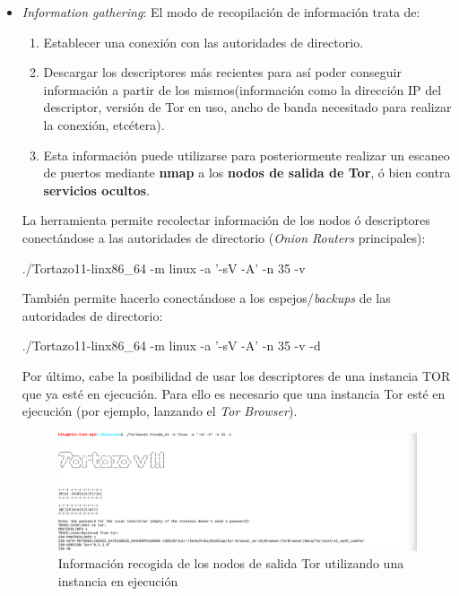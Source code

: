 \begin{itemize}
	\item{\textit{Information gathering}}: El modo de recopilación de información trata de:
	\begin{enumerate}
		\item Establecer una conexión con las autoridades de directorio.
		\item Descargar los descriptores más recientes para así poder conseguir información a partir de los mismos(información como  la dirección IP del descriptor, versión de Tor en uso, ancho de banda necesitado para realizar la conexión, etcétera). 
		\item Esta información puede utilizarse para posteriormente realizar un escaneo de puertos mediante \textbf{nmap} a los \textbf{nodos de salida de Tor}, ó bien contra \textbf{servicios ocultos}. 
	\end{enumerate}
	
	La herramienta permite recolectar información de los nodos ó descriptores conectándose a las autoridades de directorio (\textit{Onion Routers} principales):
	
	{\selectfont 
		./Tortazo11-linx86\_64 -m linux -a '-sV -A' -n 35 -v
	}
	
	También permite hacerlo conectándose a los espejos/\textit{backups} de las autoridades de directorio:
	
	{\selectfont 
		./Tortazo11-linx86\_64 -m linux -a '-sV -A' -n 35 -v -d
	}
	
	Por último, cabe la posibilidad de usar los descriptores de una instancia TOR que ya esté en ejecución. Para ello es necesario que una instancia Tor esté en ejecución (por ejemplo, lanzando el \textit{Tor Browser}).
	
	\begin{figure}[h]
		\centerline{
			\mbox{\includegraphics[width=5.00in]{images/tortazo_OR1.png}}
		}
		\caption{Información recogida de los nodos de salida Tor utilizando una instancia en ejecución}
		\label{fig:norm_Daugman}
	\end{figure} 
	

\end{itemize}
